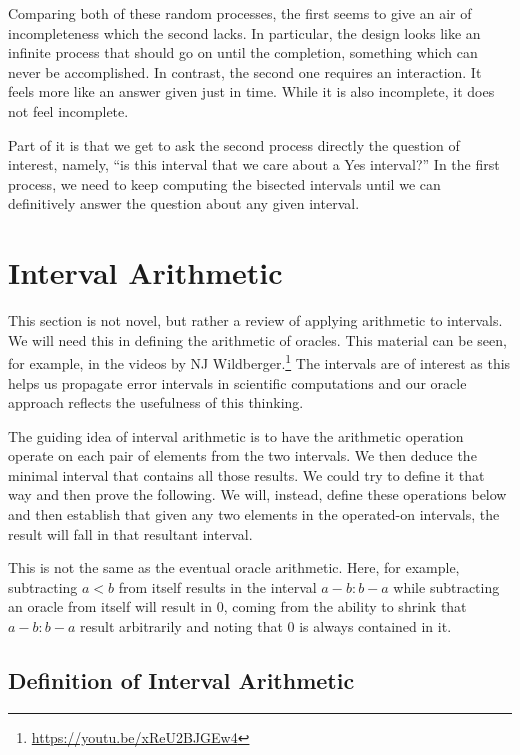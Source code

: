 \documentclass[12pt]{article}
\theoremstyle{remark}
\begin{document}
Comparing both of these random processes, the first seems to give an air of incompleteness which the second lacks. In particular, the design looks like an infinite process that should go on until the completion, something which can never be accomplished. In contrast, the second one requires an interaction. It feels more like an answer given just in time. While it is also incomplete, it does not feel incomplete. 

Part of it is that we get to ask the second process directly the question of interest, namely, ``is this interval that we care about a Yes interval?'' In the first process, we need to keep computing the bisected intervals until we can definitively answer the question about any given interval. 

\section{Interval Arithmetic}

This section is not novel, but rather a review of applying arithmetic to intervals. We will need this in defining the arithmetic of oracles. This material can be seen, for example, in the videos by NJ Wildberger.\footnote{\url{https://youtu.be/xReU2BJGEw4}} The intervals are of interest as this helps us propagate error intervals in scientific computations and our oracle approach reflects the usefulness of this thinking. 

The guiding idea of interval arithmetic is to have the arithmetic operation operate on each pair of elements from the two intervals. We then deduce the minimal interval that contains all those results. We could try to define it that way and then prove the following. We will, instead, define these operations below and then establish that given any two elements in the operated-on intervals, the result will fall in that resultant interval. 

This is not the same as the eventual oracle arithmetic. Here, for example, subtracting $a<b$ from itself results in the interval $a-b:b-a$ while subtracting an oracle from itself will result in $0$, coming from the ability to shrink that $a-b:b-a$ result arbitrarily and noting that $0$ is always contained in it. 

\subsection{Definition of Interval Arithmetic}
\end{document}
